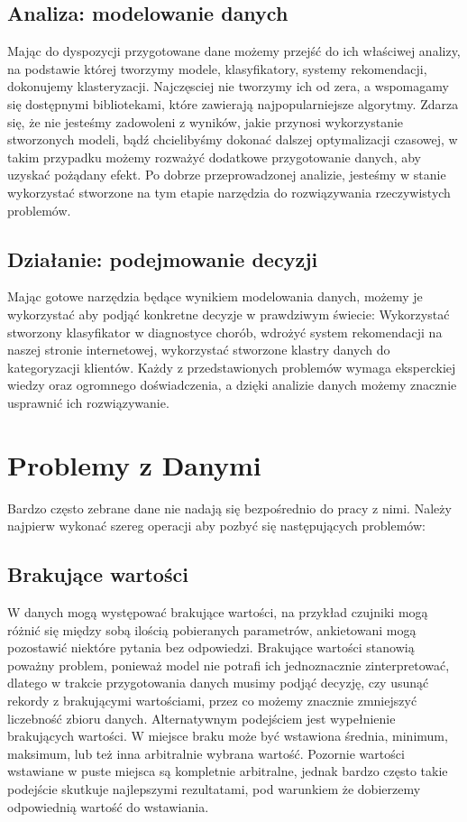 \documentclass{book}
\begin{document}
\subsection{Analiza: modelowanie danych}
Mając do dyspozycji przygotowane dane możemy przejść do ich właściwej analizy, 
na podstawie której tworzymy modele, klasyfikatory, systemy rekomendacji, dokonujemy klasteryzacji. 
Najczęsciej nie tworzymy ich od zera, a wspomagamy się dostępnymi bibliotekami, które zawierają 
najpopularniejsze algorytmy. Zdarza się, że nie jesteśmy zadowoleni z wyników, jakie przynosi 
wykorzystanie stworzonych modeli, bądź chcielibyśmy dokonać dalszej optymalizacji czasowej, 
w takim przypadku możemy rozważyć dodatkowe przygotowanie danych, aby uzyskać pożądany efekt.
Po dobrze przeprowadzonej analizie, jesteśmy w stanie 
wykorzystać stworzone na tym etapie narzędzia do rozwiązywania rzeczywistych problemów.

\subsection{Działanie: podejmowanie decyzji}
Mając gotowe narzędzia będące wynikiem modelowania danych, możemy je wykorzystać aby podjąć 
konkretne decyzje w prawdziwym świecie: Wykorzystać stworzony 
klasyfikator w diagnostyce chorób, wdrożyć system rekomendacji 
na naszej stronie internetowej, wykorzystać stworzone klastry danych do kategoryzacji klientów. 
Każdy z przedstawionych problemów wymaga eksperckiej wiedzy oraz ogromnego doświadczenia, 
a dzięki analizie danych możemy znacznie usprawnić ich rozwiązywanie.

\section{Problemy z Danymi}

Bardzo często zebrane dane nie nadają się bezpośrednio do pracy z nimi. 
Należy najpierw wykonać szereg operacji aby pozbyć się następujących 
problemów:   
\subsection{Brakujące wartości}
W danych mogą występować brakujące wartości, na przykład czujniki 
mogą różnić się między sobą ilością pobieranych parametrów, 
ankietowani mogą pozostawić niektóre pytania bez odpowiedzi. 
Brakujące wartości stanowią poważny problem, ponieważ model nie 
potrafi ich jednoznacznie zinterpretować, dlatego w trakcie 
przygotowania danych musimy podjąć decyzję, czy usunąć rekordy z 
brakującymi wartościami, przez co możemy znacznie zmniejszyć 
liczebność zbioru danych. Alternatywnym podejściem jest wypełnienie 
brakujących wartości. W miejsce braku może być wstawiona średnia, 
minimum, maksimum, lub też inna arbitralnie wybrana wartość. 
Pozornie wartości wstawiane w puste miejsca są kompletnie arbitralne, 
jednak bardzo często takie podejście skutkuje najlepszymi rezultatami, 
pod warunkiem że dobierzemy odpowiednią wartość do wstawiania. 
\end{document}
